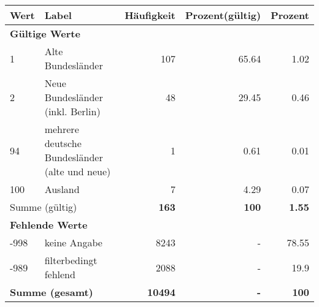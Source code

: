      \begin{longtable}{lXrrr}
     \toprule
     \textbf{Wert} & \textbf{Label} & \textbf{Häufigkeit} & \textbf{Prozent(gültig)} & \textbf{Prozent} \\
     \endhead
     \midrule
     \multicolumn{5}{l}{\textbf{Gültige Werte}}\\

     1 &
     \multicolumn{1}{X}{ Alte Bundesländer   } &


       \num{107} &
       \num[round-mode=places,round-precision=2]{65,64} &
         \num[round-mode=places,round-precision=2]{1,02} \\

     2 &
     \multicolumn{1}{X}{ Neue Bundesländer (inkl. Berlin)   } &


       \num{48} &
       \num[round-mode=places,round-precision=2]{29,45} &
         \num[round-mode=places,round-precision=2]{0,46} \\

     94 &
     \multicolumn{1}{X}{ mehrere deutsche Bundesländer (alte und neue)   } &


       \num{1} &
       \num[round-mode=places,round-precision=2]{0,61} &
         \num[round-mode=places,round-precision=2]{0,01} \\

     100 &
     \multicolumn{1}{X}{ Ausland   } &


       \num{7} &
       \num[round-mode=places,round-precision=2]{4,29} &
         \num[round-mode=places,round-precision=2]{0,07} \\
     \midrule
     \multicolumn{2}{l}{Summe (gültig)} &
       \textbf{\num{163}} &
     \textbf{100} &
       \textbf{\num[round-mode=places,round-precision=2]{1,55}} \\
     \multicolumn{5}{l}{\textbf{Fehlende Werte}}\\
       -998 &
       keine Angabe &
         \num{8243} &
        - &
         \num[round-mode=places,round-precision=2]{78,55} \\
       -989 &
       filterbedingt fehlend &
         \num{2088} &
        - &
         \num[round-mode=places,round-precision=2]{19,9} \\
     \midrule
     \multicolumn{2}{l}{\textbf{Summe (gesamt)}} &
          \textbf{\num{10494}} &
        \textbf{-} &
        \textbf{100} \\
     \bottomrule
     \end{longtable}
     

